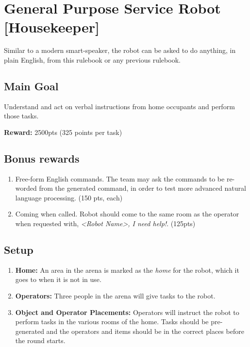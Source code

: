 \section{General Purpose Service Robot [Housekeeper]}
Similar to a modern smart-speaker, the robot can be asked to do anything, in plain English, from this rulebook or any previous rulebook.


\subsection{Main Goal}
Understand and act on verbal instructions from home occupants and perform those tasks.

\noindent\textbf{Reward:} 2500pts (325 points per task)\\

\subsection{Bonus rewards}
\begin{enumerate}[nosep]
	\item Free-form English commands. The team may ask the commands to be re-worded from the generated command, in order to test more advanced natural language processing. (150 pts, each)
	\item Coming when called. Robot should come to the same room as the operator when requested with, \textit {<Robot Name>, I need help!}. (125pts)
\end{enumerate}

%
%
\subsection{Setup}
\begin{enumerate}
	\item \textbf{Home:} An area in the arena is marked as the \textit{home} for the robot, which it goes to when it is not in use.

	\item \textbf{Operators:} Three people in the arena will give tasks to the robot.

	\item \textbf{Object and Operator Placements:} Operators will instruct the robot to perform tasks in the various rooms of the home. Tasks should be pre-generated and the operators and items should be in the correct places before the round starts.
\end{enumerate}

